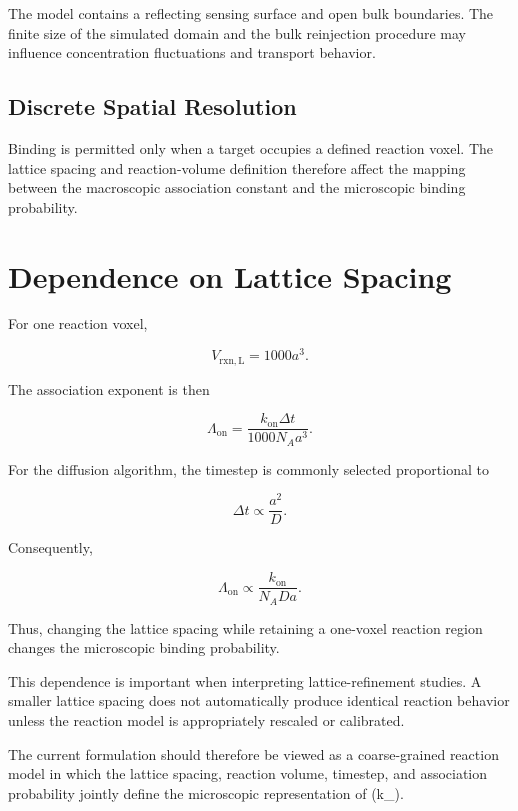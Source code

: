 \documentclass[11pt]{article}
\begin{document}
The model contains a reflecting sensing surface and open bulk boundaries. The finite size of the simulated domain and the bulk reinjection procedure may influence concentration fluctuations and transport behavior.

\subsection{Discrete Spatial Resolution}

Binding is permitted only when a target occupies a defined reaction voxel. The lattice spacing and reaction-volume definition therefore affect the mapping between the macroscopic association constant and the microscopic binding probability.

\section{Dependence on Lattice Spacing}

For one reaction voxel,

\begin{equation}
V_{\mathrm{rxn,L}}
=
1000a^3.
\end{equation}

The association exponent is then

\begin{equation}
\Lambda_{\mathrm{on}}
=
\frac{
k_{\mathrm{on}}\Delta t
}{
1000N_Aa^3
}.
\end{equation}

For the diffusion algorithm, the timestep is commonly selected proportional to

\begin{equation}
\Delta t
\propto
\frac{a^2}{D}.
\end{equation}

Consequently,

\begin{equation}
\Lambda_{\mathrm{on}}
\propto
\frac{k_{\mathrm{on}}}{N_A D a}.
\end{equation}

Thus, changing the lattice spacing while retaining a one-voxel reaction region changes the microscopic binding probability.

This dependence is important when interpreting lattice-refinement studies. A smaller lattice spacing does not automatically produce identical reaction behavior unless the reaction model is appropriately rescaled or calibrated.

The current formulation should therefore be viewed as a coarse-grained reaction model in which the lattice spacing, reaction volume, timestep, and association probability jointly define the microscopic representation of (k_{}).
\end{document}
